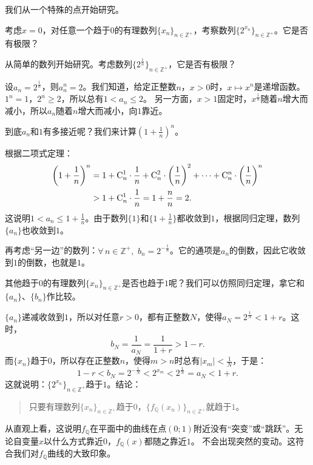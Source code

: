 \documentclass[12pt,UTF8]{ctexbook}
\begin{document}
我们从一个特殊的点开始研究。
\begin{et}
    考虑$x=0$，对任意一个趋于$0$的有理数列$\{x_n\}_{n\in\mathbb{Z}^+}$，考察数列$\{2^{x_n}\}_{n\in\mathbb{Z}^+}$。它是否有极限？
\end{et}
\begin{so}
    从简单的数列开始研究。考虑数列$\{2^\frac{1}{n}\}_{n\in\mathbb{Z}^+}$，它是否有极限？

    设$a_n = 2^\frac{1}{n}$，则$a_n^n = 2$。我们知道，给定正整数$n$，$x>0$时，$x\mapsto x^n$是递增函数。$1^n=1$，$2^n\geqslant 2$，所以总有$1<a_n\leqslant 2$。
    另一方面，$x>1$固定时，$x^\frac{1}{n}$随着$n$增大而减小，所以$a_n$随着$n$增大而减小，向$1$靠近。

    到底$a_n$和$1$有多接近呢？我们来计算$\left(1+\frac{1}{n}\right)^n$。

    根据二项式定理：
    \begin{align*}
        \left(1+\frac{1}{n}\right)^n &= 1 + \mathrm{C}_{n}^{1}\cdot \frac{1}{n} + \mathrm{C}_{n}^{2}\cdot \left(\frac{1}{n}\right)^2 + \cdots + \mathrm{C}_{n}^{n}\cdot \left(\frac{1}{n}\right)^n  \\
        &> 1 + \mathrm{C}_{n}^{1}\cdot \frac{1}{n} = 1 + \frac{n}{n} = 2. 
    \end{align*}
    这说明$1<a_n\leqslant 1 + \frac{1}{n}$。由于数列$\{1\}$和$\{1 + \frac{1}{n}\}$都收敛到$1$，根据同归定理，数列$\{a_n\}$也收敛到$1$。

    再考虑“另一边”的数列：$\forall \, n\in\mathbb{Z}^+,\,\, b_n = 2^{-\frac{1}{n}}$。它的通项是$a_n$的倒数，因此它收敛到$1$的倒数，也就是$1$。

    其他趋于$0$的有理数列$\{x_n\}_{n\in\mathbb{Z}^+}$是否也趋于$1$呢？我们可以仿照同归定理，拿它和$\{a_n\}$、$\{b_n\}$作比较。

    $\{a_n\}$递减收敛到$1$，所以对任意$r>0$，都有正整数$N$，使得$a_{N} = 2^{\frac{1}{N}} < 1 + r$。这时，
    $$b_N = \frac{1}{a_N} = \frac{1}{1 + r} > 1 - r.$$
    而$\{x_n\}$趋于$0$，所以存在正整数$n$，使得$m>n$时总有$|x_m| < \frac{1}{N}$，于是：
    $$1 - r < b_N = 2^{-\frac{1}{N}} < 2^{x_m} < 2^\frac{1}{N} = a_N < 1 + r.$$
    这就说明：$\{2^{x_n}\}_{n\in\mathbb{Z}^+}$趋于$1$。结论：
    \begin{quotation}
        只要有理数列$\{x_n\}_{n\in\mathbb{Z}^+}$趋于$0$，$\{f_{\mathbb{Q}}(x_n)\}_{n\in\mathbb{Z}^+}$就趋于$1$。
    \end{quotation}
\end{so}

从直观上看，这说明$f_{\mathbb{Q}}$在平面中的曲线在点$(0;1)$附近没有“突变”或“跳跃”。无论自变量$x$以什么方式靠近$0$，$f_{\mathbb{Q}}(x)$都随之靠近$1$。
不会出现突然的变动。这符合我们对$f_{\mathbb{Q}}$曲线的大致印象。
\end{document}
